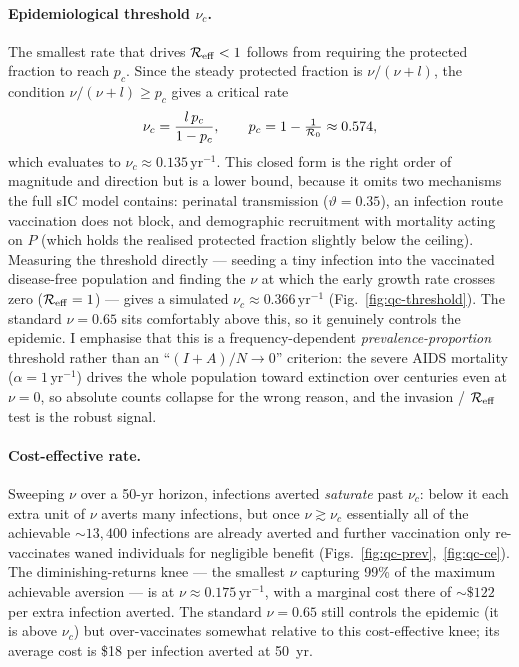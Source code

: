 \paragraph{Epidemiological threshold $\nu_c$.}
The smallest rate that drives $\mathcal{R}_{\mathrm{eff}}<1$ follows from requiring the protected
fraction to reach $p_c$. Since the steady protected fraction is $\nu/(\nu+l)$, the
condition $\nu/(\nu+l)\ge p_c$ gives a critical rate
\begin{equation}
\nu_c = \frac{l\,p_c}{1-p_c},
\qquad p_c = 1-\tfrac{1}{\mathcal{R}_0}\approx0.574,
\end{equation}
which evaluates to $\nu_c\approx0.135\,\text{yr}^{-1}$. This closed form is the
right order of magnitude and direction but is a lower bound, because it omits two
mechanisms the full sIC model contains: perinatal transmission ($\vartheta=0.35$),
an infection route vaccination does not block, and demographic recruitment with
mortality acting on $P$ (which holds the realised protected fraction slightly below
the ceiling). Measuring the threshold directly --- seeding a tiny infection into the
vaccinated disease-free population and finding the $\nu$ at which the early growth
rate crosses zero ($\mathcal{R}_{\mathrm{eff}}=1$) --- gives a simulated $\nu_c\approx0.366\,\text{yr}^{-1}$
(Fig.~\ref{fig:qc-threshold}). The standard $\nu=0.65$ sits comfortably above this,
so it genuinely controls the epidemic. I emphasise that this is a frequency-dependent
\emph{prevalence-proportion} threshold rather than an ``$(I+A)/N\to0$'' criterion:
the severe AIDS mortality ($\alpha=1\,\text{yr}^{-1}$) drives the whole population
toward extinction over centuries even at $\nu=0$, so absolute counts collapse for
the wrong reason, and the invasion / $\mathcal{R}_{\mathrm{eff}}$ test is the robust signal.

\paragraph{Cost-effective rate.}
Sweeping $\nu$ over a 50-yr horizon, infections averted \emph{saturate} past
$\nu_c$: below it each extra unit of $\nu$ averts many infections, but once
$\nu\gtrsim\nu_c$ essentially all of the achievable $\sim\!13{,}400$ infections are
already averted and further vaccination only re-vaccinates waned individuals for
negligible benefit (Figs.~\ref{fig:qc-prev},~\ref{fig:qc-ce}). The
diminishing-returns knee --- the smallest $\nu$ capturing 99\% of the maximum
achievable aversion --- is at $\nu\approx0.175\,\text{yr}^{-1}$, with a marginal cost
there of $\sim\!\$122$ per extra infection averted. The standard $\nu=0.65$ still
controls the epidemic (it is above $\nu_c$) but over-vaccinates somewhat relative to
this cost-effective knee; its average cost is \$18 per infection averted at 50~yr.


